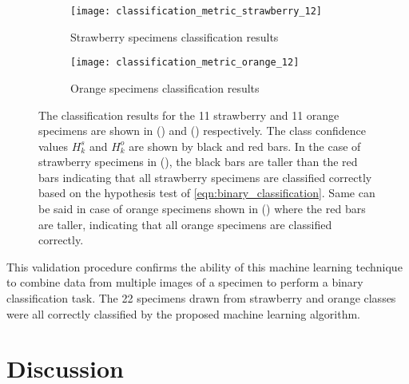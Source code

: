 %
\begin{figure*}
  \centering
  \begin{subfigure}[]{0.7\textwidth}
      \texttt{[image: classification\_metric\_strawberry\_12]}
      \caption{Strawberry specimens classification results}
      \label{fig:results_strawberry}
  \end{subfigure}
  \vskip -2pt
  \begin{subfigure}[]{0.7\textwidth}
      \texttt{[image: classification\_metric\_orange\_12]}
      \caption{Orange specimens classification results}
      \label{fig:results_orange}
  \end{subfigure}
\caption[Classification results]{The classification results for the 11 strawberry and 11 orange specimens are shown in () and () respectively. The class confidence values $H^s_k$ and $H^o_k$ are shown by black and red bars. In the case of strawberry specimens in (), the black bars are taller than the red bars indicating that all strawberry specimens are classified correctly based on the hypothesis test of \eqref{eqn:binary_classification}. Same can be said in case of orange specimens shown in () where the red bars are taller, indicating that all orange specimens are classified correctly.}
\label{fig:results}
\end{figure*}	
%

This validation procedure confirms the ability of this machine learning technique to combine data from multiple images of a specimen to perform a binary classification task. The 22 specimens drawn from strawberry and orange classes were all correctly classified by the proposed machine learning algorithm.

\section{Discussion}



